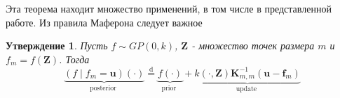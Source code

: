 \documentclass[12pt, twoside]{article}
\newcommand{\bZ}{{\mathbf{Z}}}
\newtheorem{corollary}{Утверждение}
\begin{document}
Эта теорема находит множество применений, в том числе в представленной работе. Из правила Маферона следует важное
\begin{corollary}
Пусть $f \sim GP(0, k)$, $\bZ$ - множество точек размера $m$ и $f_m = f(\bZ)$. Тогда 
\begin{equation}
    \underbrace{(f \mid f_m = \boldsymbol{u})(\cdot)}_{\text {posterior }} \stackrel{\mathrm{d}}{=} \underbrace{f(\cdot)}_{\text {prior }}+\underbrace{k(\cdot, \mathbf{Z}) \mathbf{K}_{m, m}^{-1}\left(\boldsymbol{u}-\boldsymbol{f}_{m}\right)}_{\text {update }}
\end{equation}


\end{corollary}
\end{document}
